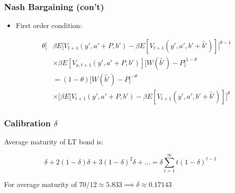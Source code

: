 \documentclass{beamer}
\begin{document}
\begin{frame}[label = nb_foc]
\frametitle{Nash Bargaining (con't)}

\begin{itemize}[<+->] 

\item First order condition:

\begin{align*}
\theta \Bigg[&\beta E[V_{t+1}(y', a' + P, b') - \beta E[V_{t+1}(y', a', b' + \hat{b}')]\Bigg]^{\theta-1} \\
&\times \beta E[V_{a,t+1}(y', a' + P, b')] \Bigg[ W(\hat{b}') - P\Bigg]^{1-\theta}\\
&= (1-\theta)\Bigg[ W(\hat{b}') - P\Bigg]^{-\theta}\\
&\times\Bigg[\beta E[V_{t+1}(y', a' + P, b') - \beta E[V_{t+1}(y', a', b' + \hat{b}')]\Bigg]^\theta
\end{align*}

\end{itemize}

\end{frame}





\begin{frame}[label = delta]
\frametitle{Calibration $\delta$}


Average maturity of LT bond is:

$$
\delta + 2(1-\delta)\delta + 3(1-\delta)^2 \delta + ... = \delta \sum_{t=1}^\infty  t (1-\delta)^{t-1}
$$

For average maturity of $70/12 \approx 5.833 \implies \delta \approx 0.17143$ 

\end{frame}
\end{document}
